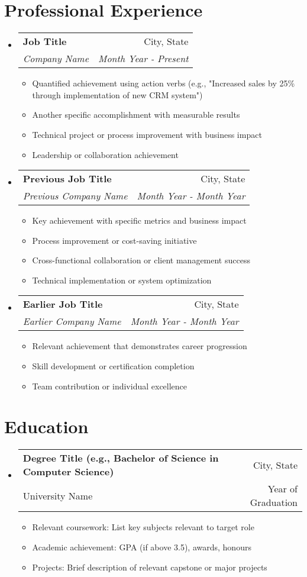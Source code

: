 \documentclass[11pt,a4paper]{article}
\makeatletter
\newcommand{\resumeItem}[1]{
  \item\small{#1}
}
\newcommand{\resumeSubheading}[4]{
  \vspace{-1pt}\item
    \begin{tabular*}{\textwidth}[t]{l@{\extracolsep{\fill}}r}
      \textbf{#1} & #2 \\
      \textit{#3} & \textit{#4} \\
    \end{tabular*}\vspace{-5pt}
}
\newcommand{\resumeEducationSubheading}[4]{
  \vspace{-1pt}\item
    \begin{tabular*}{\textwidth}[t]{l@{\extracolsep{\fill}}r}
      \textbf{#1} & #2 \\
      #3 & #4 \\
    \end{tabular*}\vspace{-5pt}
}
\makeatother
\begin{document}
\section{Professional Experience}
\begin{itemize}[leftmargin=*]
    \resumeSubheading
      {Job Title}{City, State}
      {Company Name}{Month Year - Present}
      \begin{itemize}[leftmargin=*]
        \resumeItem{Quantified achievement using action verbs (e.g., "Increased sales by 25\% through implementation of new CRM system")}
        \resumeItem{Another specific accomplishment with measurable results}
        \resumeItem{Technical project or process improvement with business impact}
        \resumeItem{Leadership or collaboration achievement}
      \end{itemize}
      
    \resumeSubheading
      {Previous Job Title}{City, State}
      {Previous Company Name}{Month Year - Month Year}
      \begin{itemize}[leftmargin=*]
        \resumeItem{Key achievement with specific metrics and business impact}
        \resumeItem{Process improvement or cost-saving initiative}
        \resumeItem{Cross-functional collaboration or client management success}
        \resumeItem{Technical implementation or system optimization}
      \end{itemize}
      
    \resumeSubheading
      {Earlier Job Title}{City, State}
      {Earlier Company Name}{Month Year - Month Year}
      \begin{itemize}[leftmargin=*]
        \resumeItem{Relevant achievement that demonstrates career progression}
        \resumeItem{Skill development or certification completion}
        \resumeItem{Team contribution or individual excellence}
      \end{itemize}
\end{itemize}

\section{Education}
\begin{itemize}[leftmargin=*]
    \resumeEducationSubheading
      {Degree Title (e.g., Bachelor of Science in Computer Science)}{City, State}
      {University Name}{Year of Graduation}
      \begin{itemize}[leftmargin=*]
        \resumeItem{Relevant coursework: List key subjects relevant to target role}
        \resumeItem{Academic achievement: GPA (if above 3.5), awards, honours}
        \resumeItem{Projects: Brief description of relevant capstone or major projects}
      \end{itemize}
\end{itemize}
\end{document}

